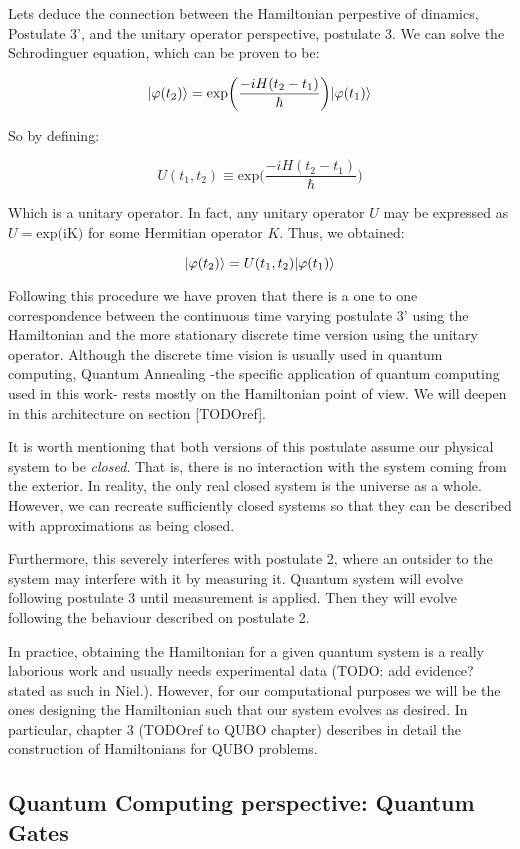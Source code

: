 Lets deduce the connection between the Hamiltonian perpestive of dinamics, Postulate 3', and the unitary operator perspective, postulate 3. We can solve the Schrodinguer equation, which can be proven to be:

$$ |\varphi(t_2)\rangle = \text{exp} \bigg(  \frac{-iH(t_2-t_1)}{\hbar} \bigg) |\varphi(t_1)\rangle $$

So by defining:

$$ U(t_1, t_2) \equiv \text{exp} \bigg(  \frac{-iH(t_2-t_1)}{\hbar} \bigg) $$

Which is a unitary operator. In fact, any unitary operator $U$ may be expressed as $U = \text{exp(iK)}$ for some Hermitian operator $K$. Thus, we obtained: 

$$ |\varphi(t_2)\rangle = U(t_1, t_2) |\varphi(t_1)\rangle $$

Following this procedure we have proven that there is a one to one correspondence between the continuous time varying postulate 3' using the Hamiltonian and the more stationary discrete time version using the unitary operator. Although the discrete time vision is usually used in quantum computing, Quantum Annealing -the specific application of quantum computing used in this work- rests mostly on the Hamiltonian point of view. We will deepen in this architecture on section [TODOref].

It is worth mentioning that both versions of this postulate assume our physical system to be \emph{closed}. That is, there is no interaction with the system coming from the exterior. In reality, the only real closed system is the universe as a whole. However, we can recreate sufficiently closed systems so that they can be described with approximations as being closed. 

Furthermore, this severely interferes with postulate 2, where an outsider to the system may interfere with it by measuring it. Quantum system will evolve following postulate 3 until measurement is applied. Then they will evolve following the behaviour described on postulate 2.

In practice, obtaining the Hamiltonian for a given quantum system is a really laborious work and usually needs experimental data (TODO: add evidence? stated as such in Niel.). However, for our computational purposes we will be the ones designing the Hamiltonian such that our system evolves as desired. In particular, chapter 3 (TODOref to QUBO chapter) describes in detail the construction of Hamiltonians for QUBO problems.

\subsection{Quantum Computing perspective: Quantum Gates}

